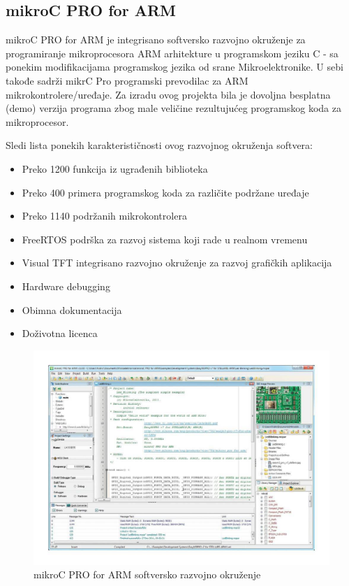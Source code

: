 \documentclass[a4paper, 12pt, oneside, titlepage]{article}
\begin{document}
      \subsection{mikroC PRO for ARM}
      mikroC PRO for ARM je integrisano softversko razvojno okruženje za programiranje mikroprocesora ARM arhitekture u programskom jeziku C - sa ponekim modifikacijama programskog jezika
      od srane Mikroelektronike. U sebi takođe sadrži mikrC Pro programski prevodilac za ARM mikrokontrolere/uređaje. Za izradu ovog projekta bila je dovoljna besplatna (demo) verzija
      programa zbog male veličine rezultujućeg programskog koda za mikroprocesor.
      
      \noindent Sledi lista ponekih karakterističnosti ovog razvojnog okruženja softvera:
      \begin{itemize}
	\item Preko 1200 funkcija iz ugrađenih biblioteka
	\item Preko 400 primera programskog koda za različite podržane uređaje
	\item Preko 1140 podržanih mikrokontrolera
	\item FreeRTOS podrška za razvoj sistema koji rade u realnom vremenu
	\item Visual TFT integrisano razvojno okruženje za razvoj grafičkih aplikacija
	\item Hardware debugging
	\item Obimna dokumentacija
	\item Doživotna licenca
      \end{itemize}
      \begin{figure}[H]
        \centering
        \includegraphics[width=\textwidth]{slike/mikroc_pro_arm_ide}
        \caption{mikroC PRO for ARM softversko razvojno okruženje}
        \label{fig:mikroc_pro_arm_ide} %
      \end{figure}
      
\end{document}
